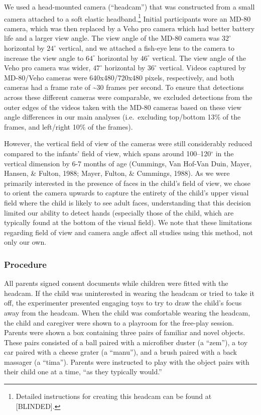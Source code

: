 \documentclass[english,man]{apa6}
\begin{document}
We used a head-mounted camera (\enquote{headcam}) that was constructed
from a small camera attached to a soft elastic headband.\footnote{Detailed
  instructions for creating this headcam can be found at {[}BLINDED{]}.}
Initial participants wore an MD-80 camera, which was then replaced by a
Veho pro camera which had better battery life and a larger view angle.
The view angle of the MD-80 camera was \(32^{\circ}\) horizontal by
\(24^{\circ}\) vertical, and we attached a fish-eye lens to the camera
to increase the view angle to \(64^{\circ}\) horizontal by
\(46^{\circ}\) vertical. The view angle of the Veho pro camera was
wider, \(47^{\circ}\) horizontal by \(36^{\circ}\) vertical. Videos
captured by MD-80/Veho cameras were 640x480/720x480 pixels,
respectively, and both cameras had a frame rate of \textasciitilde{}30
frames per second. To ensure that detections across these different
cameras were comparable, we excluded detections from the outer edges of
the videos taken with the MD-80 cameras based on these view angle
differences in our main analyses (i.e.~excluding top/bottom 13\% of the
frames, and left/right 10\% of the frames).

However, the vertical field of view of the cameras were still
considerably reduced compared to the infants' field of view, which spans
around 100--120\(^{\circ}\) in the vertical dimension by 6-7 months of
age (Cummings, Van Hof-Van Duin, Mayer, Hansen, \& Fulton, 1988; Mayer,
Fulton, \& Cummings, 1988). As we were primarily interested in the
presence of faces in the child's field of view, we chose to orient the
camera upwards to capture the entirety of the child's upper visual field
where the child is likely to see adult faces, understanding that this
decision limited our ability to detect hands (especially those of the
child, which are typically found at the bottom of the visual field). We
note that these limitations regarding field of view and camera angle
affect all studies using this method, not only our own.

\subsubsection{Procedure}\label{procedure}

All parents signed consent documents while children were fitted with the
headcam. If the child was uninterested in wearing the headcam or tried
to take it off, the experimenter presented engaging toys to try to draw
the child's focus away from the headcam. When the child was comfortable
wearing the headcam, the child and caregiver were shown to a playroom
for the free-play session. Parents were shown a box containing three
pairs of familiar and novel objects. These pairs consisted of a ball
paired with a microfiber duster (a \enquote{zem}), a toy car paired with
a cheese grater (a \enquote{manu}), and a brush paired with a back
massager (a \enquote{tima}). Parents were instructed to play with the
object pairs with their child one at a time, \enquote{as they typically
would.}
\end{document}
